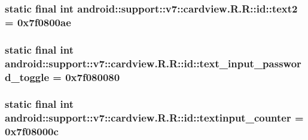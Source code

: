 \hypertarget{classandroid_1_1support_1_1v7_1_1cardview_1_1_r_1_1id_9abe9347e3d459af9faa42a6f28a59c3}{
\subsubsection[{text2}]{\setlength{\rightskip}{0pt plus 5cm}static final int android::support::v7::cardview.R.R::id::text2 = 0x7f0800ae}}
\label{classandroid_1_1support_1_1v7_1_1cardview_1_1_r_1_1id_9abe9347e3d459af9faa42a6f28a59c3}


\hypertarget{classandroid_1_1support_1_1v7_1_1cardview_1_1_r_1_1id_934f6a6aec3847faf984eed683c2d786}{
\subsubsection[{text\_\-input\_\-password\_\-toggle}]{\setlength{\rightskip}{0pt plus 5cm}static final int android::support::v7::cardview.R.R::id::text\_\-input\_\-password\_\-toggle = 0x7f080080}}
\label{classandroid_1_1support_1_1v7_1_1cardview_1_1_r_1_1id_934f6a6aec3847faf984eed683c2d786}


\hypertarget{classandroid_1_1support_1_1v7_1_1cardview_1_1_r_1_1id_760ccaca921cb7a3ec8dabd0e5790a8a}{
\subsubsection[{textinput\_\-counter}]{\setlength{\rightskip}{0pt plus 5cm}static final int android::support::v7::cardview.R.R::id::textinput\_\-counter = 0x7f08000c}}
\label{classandroid_1_1support_1_1v7_1_1cardview_1_1_r_1_1id_760ccaca921cb7a3ec8dabd0e5790a8a}


